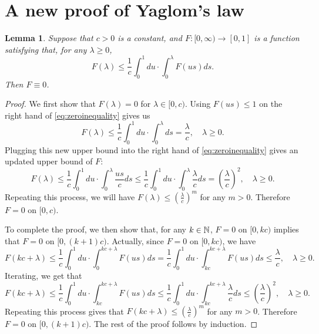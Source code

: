 \documentclass[12pt]{amsart}
\newtheorem{lem}[thm]{Lemma}
\numberwithin{equation}{section}
\newcommand{\expr}[1]{\left( #1 \right)}
\begin{document}
\section{A new proof of Yaglom's law}
\label{sec:anewproofofyaglomslaw}
\begin{lem}
\label{lem:zeroinequality}
    Suppose that $c>0$ is a constant, and $F:[0,\infty)\to [0,1]$ 
    is 
    a function satisfying that, for any $\lambda\geq 0$,
\begin{equation}
\label{eq:zeroinequality}
	    F(\lambda)
	\leq
	    \frac{1}{c}\int_0^1du
	\cdot
	    \int_0^\lambda F(us)ds.
\end{equation}
    Then $F\equiv 0$.
\end{lem}
\begin{proof}
	We first show that $F(\lambda)=0$ for $\lambda \in [0,c)$.
    Using  $F(us)\leq 1$ on the right hand of \eqref{eq:zeroinequality} gives us
\begin{equation*}
        F(\lambda)
    \leq
        \frac{1}{c}\int_0^1du
    \cdot
	    \int_0^\lambda ds
	=
	    \frac{\lambda}{c},
	\quad 
		\lambda\geq 0.
\end{equation*}
	Plugging this new upper bound into the right hand of \eqref{eq:zeroinequality} gives an updated upper bound of $F$:
\begin{equation*}
        F(\lambda)
    \leq
        \frac{1}{c}\int_0^1du
    \cdot
	    \int_0^\lambda \frac{us}{c}ds
	\leq
        \frac{1}{c}\int_0^1du
    \cdot
	    \int_0^\lambda \frac{\lambda}{c}ds
	=
	    \expr{\frac{\lambda}{c}}^2,
	\quad 
		\lambda\geq 0.
\end{equation*}
    Repeating this process, we will have $F(\lambda)\leq (\frac{\lambda}{c})^m$ for any $m>0$. Therefore $F=0$ on $[0,c)$.
\par
    To complete the proof, we then show that, for any $k\in\mathbb N$, $F=0$ on $[0,kc)$ implies that $F=0$ on $[0,(k+1)c)$. 
	Actually, since $F=0$ on $[0,kc)$, we have
\begin{equation*}
	    F\expr{kc+\lambda}
	\leq
	    \frac{1}{c}\int_0^1 du\cdot\int_0^{kc+\lambda}F(us)ds
	=
	    \frac{1}{c}\int_0^1du\cdot\int_{kc}^{kc+\lambda} 
	    F(us)ds\leq\frac{\lambda}{c}, \quad \lambda\geq 0.
\end{equation*}
	Iterating, we get that
\begin{equation*}
	    F(kc+\lambda)
	\leq
	    \frac{1}{c}\int_0^1du\cdot\int_{kc}^{kc+\lambda} F(us)ds
	\leq
	    \frac{1}{c}\int_0^1du\cdot\int_{kc}^{kc+\lambda} \frac{\lambda}{c}ds
	\leq
		\expr{\frac{\lambda}{c}}^2, \quad \lambda\geq 0.
\end{equation*}
	Repeating this process gives that $F(kc+\lambda)\leq (\frac{\lambda}{c})^m$ for any $m>0$. Therefore $F=0$ on $[0,(k+1)c)$. The rest of the proof follows by induction.
\end{proof}
\end{document}
